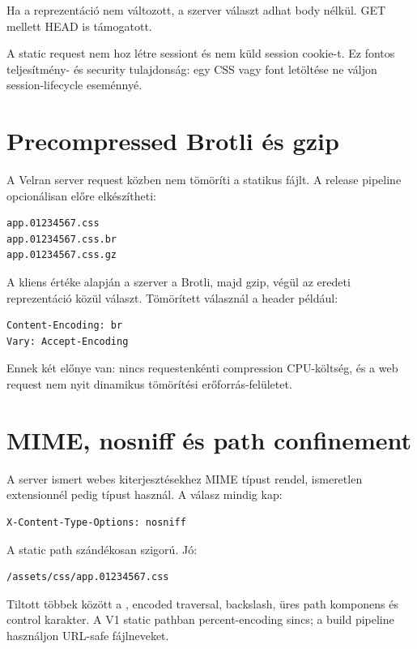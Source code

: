 Ha a reprezentáció nem változott, a szerver  választ adhat body nélkül. GET mellett HEAD is támogatott.

A static request nem hoz létre sessiont és nem küld session cookie-t. Ez fontos teljesítmény- és security tulajdonság: egy CSS vagy font letöltése ne váljon session-lifecycle eseménnyé.

\section{Precompressed Brotli és gzip}

A Velran server request közben nem tömöríti a statikus fájlt. A release pipeline opcionálisan előre elkészítheti:

\begin{lstlisting}
app.01234567.css
app.01234567.css.br
app.01234567.css.gz
\end{lstlisting}

A kliens  értéke alapján a szerver a Brotli, majd gzip, végül az eredeti reprezentáció közül választ. Tömörített válasznál a header például:

\begin{lstlisting}
Content-Encoding: br
Vary: Accept-Encoding
\end{lstlisting}

Ennek két előnye van: nincs requestenkénti compression CPU-költség, és a web request nem nyit dinamikus tömörítési erőforrás-felületet.

\section{MIME, nosniff és path confinement}

A server ismert webes kiterjesztésekhez MIME típust rendel, ismeretlen extensionnél pedig  típust használ. A válasz mindig kap:

\begin{lstlisting}
X-Content-Type-Options: nosniff
\end{lstlisting}

A static path szándékosan szigorú. Jó:

\begin{lstlisting}
/assets/css/app.01234567.css
\end{lstlisting}

Tiltott többek között a , encoded traversal, backslash, üres path komponens és control karakter. A V1 static pathban percent-encoding sincs; a build pipeline használjon URL-safe fájlneveket.

